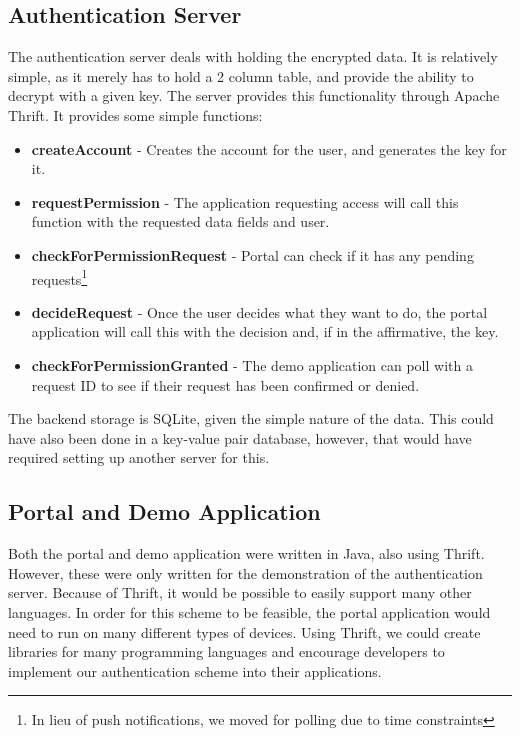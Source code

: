 \documentclass[letterpaper,twocolumn,10pt]{article}
\begin{document}
%

\subsection{Authentication Server}
    The authentication server deals with holding the encrypted data. It is relatively simple, as it merely has to hold a 2 column table, and provide the ability to decrypt with a given key. The server provides this functionality through Apache Thrift\cite{thrift}. It provides some simple functions:
    \begin{itemize}
        \item \textbf{createAccount} - Creates the account for the user, and generates the key for it.
        \item \textbf{requestPermission} - The application requesting access will call this function with the requested data fields and user.
        \item \textbf{checkForPermissionRequest} - Portal can check if it has any pending requests\footnote{In lieu of push notifications, we moved for polling due to time constraints} 
        \item \textbf{decideRequest} - Once the user decides what they want to do, the portal application will call this with the decision and, if in the affirmative, the key.
        \item \textbf{checkForPermissionGranted} - The demo application can poll with a request ID to see if their request has been confirmed or denied.
    \end{itemize}

The backend storage is SQLite, given the simple nature of the data. This could have also been done in a key-value pair database, however, that would have required setting up another server for this.

\subsection{Portal and Demo Application}
Both the portal and demo application were written in Java, also using Thrift. However, these were only written for the demonstration of the authentication server. Because of Thrift, it would be possible to easily support many other languages. In order for this scheme to be feasible, the portal application would need to run on many different types of devices. Using Thrift, we could create libraries for many programming languages and encourage developers to implement our authentication scheme into their applications.
\end{document}
